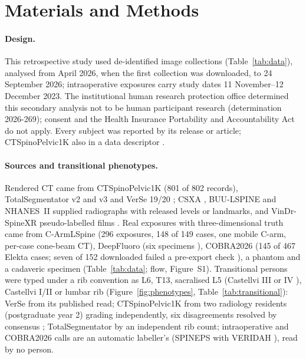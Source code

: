 \section*{Materials and Methods}

\paragraph{Design.}
This retrospective study used de-identified image collections (Table~\ref{tab:data}), analysed
from April 2026, when the first collection was downloaded, to 24 September 2026; intraoperative exposures carry study dates
11 November--12 December 2023. The institutional human research protection office determined this secondary
analysis not to be human participant research (determination 2026-269); consent and the Health Insurance
Portability and Accountability Act do not apply. Every subject was reported by its release or article; CTSpinoPelvic1K also in a
data descriptor .

\paragraph{Sources and transitional phenotypes.}
Rendered CT came from CTSpinoPelvic1K  (801 of 802 records), TotalSegmentator v2 and v3
\citep{totalsegmentator} and VerSe 19/20 \citep{verse2021}; CSXA \citep{csxa}, BUU-LSPINE \citep{buu2023} and
NHANES~II \citep{nhanes} supplied radiographs with released levels or landmarks, and VinDr-SpineXR pseudo-labelled
films \citep{vindr}. Real exposures with three-dimensional truth came from C-ArmLSpine \citep{carmlspine} (296
exposures, 148 of 149 cases, one mobile C-arm, per-case cone-beam CT), DeepFluoro (six specimens
\citep{grupp2020}), COBRA2026 (145 of 467 Elekta cases; seven of 152 downloaded failed a pre-export check
\citep{cobra2026}), a phantom \citep{genevahip} and a cadaveric specimen \citep{ljubljana2d3d}
(Table~\ref{tab:data}; flow, Figure~S1). Transitional persons were typed under a rib
convention as L6, T13, sacralised L5
(Castellvi III or IV \citep{castellvi1984}), Castellvi I/II or lumbar rib (Figure~\ref{fig:phenotypes},
Table~\ref{tab:transitional}): VerSe from its published read; CTSpinoPelvic1K from two radiology residents
(postgraduate year 2) grading independently, six disagreements resolved by consensus
; TotalSegmentator by an independent rib count; intraoperative and COBRA2026 calls are an
automatic labeller's (SPINEPS with VERIDAH \citep{veridah2026}), read by no person.

